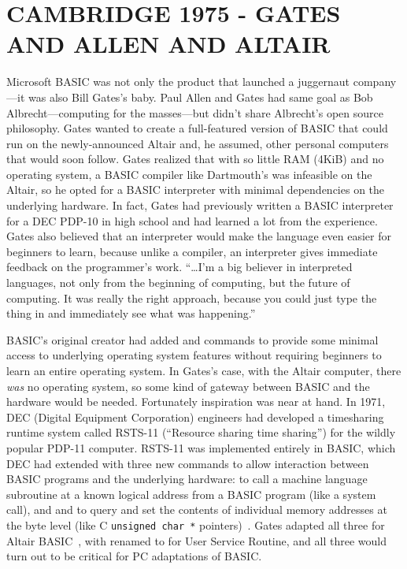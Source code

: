 
\section{CAMBRIDGE 1975 - GATES AND ALLEN AND ALTAIR}



Microsoft BASIC was not only the product that
launched a juggernaut company---it was also Bill Gates's baby.
Paul Allen and Gates had same goal as Bob Albrecht---computing for the
masses---but didn't share Albrecht's open source philosophy.  Gates
wanted to create a full-featured version of BASIC that could run on the
newly-announced Altair and, he assumed, other personal computers that
would soon follow.
Gates realized that with so little RAM 
(4KiB)  and no operating system, a BASIC compiler like Dartmouth's was
infeasible on the Altair, so he opted for a BASIC interpreter with minimal 
dependencies on the underlying hardware.
In fact, Gates had
previously written a BASIC interpreter for  a DEC PDP-10 in high school and
had learned a lot from the experience.
Gates also believed that an interpreter would make the language even
easier for beginners to learn, because unlike a compiler, 
an interpreter gives immediate feedback on the programmer's work.
``\ldots I'm a big believer in interpreted languages,
not only from the beginning of computing, but the future of
computing. It was really the right approach, because you could just type
the thing in and immediately see what was
happening.''~\cite{smithsonian_interview} 

BASIC's original creator had added  and  commands to
provide some minimal access to underlying operating system features
without requiring beginners to learn an entire operating system.
In Gates's case, with the Altair computer, there \emph{was} no operating
system, so some kind of gateway between BASIC and the hardware would be
needed.
Fortunately inspiration was near at hand.
In 1971, DEC (Digital Equipment Corporation) engineers had developed a
timesharing runtime system called RSTS-11 (``Resource sharing time
sharing'') for the wildly popular PDP-11 computer.
RSTS-11 was implemented entirely in BASIC, which DEC had extended with
three new commands to allow interaction between BASIC programs and the
underlying hardware:  to call a machine language subroutine at a
known logical address from a BASIC program (like a system call), and
 and  to query and set the contents of individual memory
addresses at the byte level (like C \texttt{unsigned char~*}
pointers)~\cite[pp.~204--205]{ceruzzi}.
Gates adapted all three for Altair BASIC~\cite{smithsonian_interview},
with  renamed to  for User Service Routine, and all three
would turn out to be critical for PC adaptations of BASIC.

